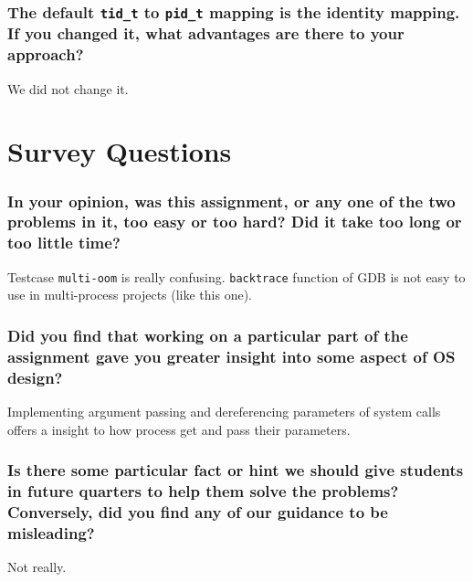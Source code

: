 \documentclass[sigconf, nonacm, balance=false, urlbreakonhyphens=true]{acmart}
\begin{document}
            \subsubsection{The default \texttt{tid\_t} to \texttt{pid\_t} mapping is the identity mapping.  If you changed it, what advantages are there to your approach? }
            
            We did not change it. 
    
    \section{Survey Questions}


        \subsubsection*{In your opinion, was this assignment, or any one of the two problems in it, too easy or too hard? Did it take too long or too little time? }
        
        Testcase \texttt{multi-oom} is really confusing. \texttt{backtrace} function of GDB is not easy to use in multi-process projects (like this one). 

        \subsubsection*{Did you find that working on a particular part of the assignment gave you greater insight into some aspect of OS design? }
        
        Implementing argument passing and dereferencing parameters of system calls offers a insight to how process get and pass their parameters. 

        \subsubsection*{Is there some particular fact or hint we should give students in future quarters to help them solve the problems? Conversely, did you find any of our guidance to be misleading? }
        
        Not really. 
\end{document}
